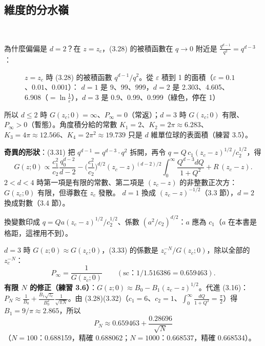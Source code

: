 \subsection{維度的分水嶺}
\ 

為什麼偏偏是 $d=2$？在 $z=z_c$，(3.28) 的被積函數在 $q\to0$ 附近是 $\frac{q^{d-1}}{q^2}=q^{d-3}$：
\begin{figure}[H]
\centering
\ThreeFigTail
\caption{$z=z_c$ 時 (3.28) 的被積函數 $q^{d-1}/q^2$。從 $\varepsilon$ 積到 1 的面積（$\varepsilon=0.1$、$0.01$、$0.001$）：
$d=1$ 是 9、99、999，$d=2$ 是 2.303、4.605、6.908（$=\ln\frac1\varepsilon$），$d=3$ 是 0.9、0.99、0.999（綠色，停在 1）}\label{three-fig-tail}
\end{figure}
所以 $d\le2$ 時 $G(z_c;0)=\infty$、$P_\infty=0$（常返）；$d=3$ 時 $G(z_c;0)$ 有限、$P_\infty>0$（暫態）。角度積分給的常數
$K_1=2$、$K_2=2\pi\approx6.283$、$K_3=4\pi\approx12.566$、$K_4=2\pi^2\approx19.739$ 只是 $d$ 維單位球的表面積（練習 3.5）。

\textbf{奇異的形狀}：(3.31) 把 $q^{d-1}=q^{d-3}\cdot q^2$ 拆開，再令 $q=Q\,c_1(z_c-z)^{1/2}/c_2^{1/2}$，得
\[G(z;0)\propto\frac{c_1^2}{c_2}\frac{q_0^{d-2}}{d-2}-\Big(\frac{c_1^2}{c_2}\Big)^{d/2}(z_c-z)^{(d-2)/2}\int_0^\infty\frac{Q^{d-3}dQ}{1+Q^2}+R\,(z_c-z).\tag{3.32}\]
$2<d<4$ 時第一項是有限的常數、第二項是 $(z_c-z)$ 的非整數正次方：$G(z_c;0)$ 有限，但導數在 $z_c$ 發散。
$d=1$ 換成 $(z_c-z)^{-1/2}$（3.3 節），$d=2$ 換成對數（3.4 節）。
\begin{errbox}[p.~61，(3.32) 與前一句]
換變數印成 $q=Qa(z_c-z)^{1/2}/c_2^{1/2}$、係數 $(a^2/c_2)^{d/2}$：$a$ 應為 $c_1$（$a$ 在本書是格距，這裡用不到）。
\end{errbox}
\begin{table}[H]
\centering
\small
\ThreeTabGzero
\caption{$z$ 逼近 $z_c$ 時的 $G(z;0)$：一維、二維一路發散，三維停在 1.516（第三列用 Bessel 積分算，並和級數 $\sum u_Nx^N$ 核對）}\label{three-tab-gzero}
\end{table}

$d=3$ 時 $G(z;0)\approx G(z_c;0)$，(3.33) 的係數是 $z_c^{-N}/G(z_c;0)$，除以全部的 $z_c^{-N}$：
\[P_\infty=\frac{1}{G(z_c;0)}\qquad(\text{sc：}1/1.516386=0.659463).\tag{3.33, 3.34}\]
\textbf{有限 $N$ 的修正（練習 3.6）}：$G(z;0)\approx B_0-B_1(z_c-z)^{1/2}$。代進 (3.16)：
$P_N\approx\frac{1}{B_0}+\frac{B_1\sqrt{z_c}}{B_0^2}\frac{1}{\sqrt{\pi N}}$。由 (3.28)(3.32)（$c_1=6$、$c_2=1$、$\int_0^\infty\frac{dQ}{1+Q^2}=\frac\pi2$）得 $B_1=9/\pi\approx2.865$，所以
\[P_N\approx0.659463+\frac{0.28696}{\sqrt N}\]
（$N=100$：0.688159，精確 0.688062；$N=1000$：0.668537，精確 0.668534）。

